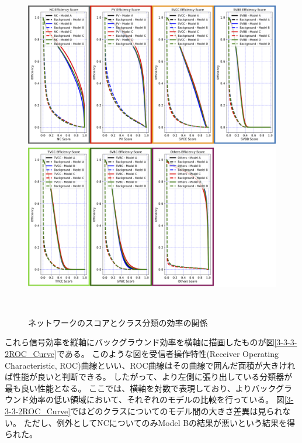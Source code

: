 \begin{figure}[htbp]
 \centering
   \begin{minipage}{1.0\textwidth}
    \centering
    \includegraphics[width=1.0\textwidth, clip]{Figure/3Networks/3-3-3-2Efficiency_Curve_1.png}
   \end{minipage}

   \begin{minipage}{1.0\textwidth}
   \centering
    \includegraphics[width=1.0\textwidth, clip]{Figure/3Networks/3-3-3-2Efficiency_Curve_2.png}
   \end{minipage}
  \caption{ネットワークのスコアとクラス分類の効率の関係}
  \label{3-3-3-2Efficiency_Curve}
\end{figure}

これら信号効率を縦軸にバックグラウンド効率を横軸に描画したものが図\ref{3-3-3-2ROC_Curve}である。
このような図を受信者操作特性(Receiver Operating Characteristic, ROC)曲線といい、ROC曲線はその曲線で囲んだ面積が大きければ性能が良いと判断できる。
したがって、より左側に張り出している分類器が最も良い性能となる。
ここでは、横軸を対数で表現しており、よりバックグラウンド効率の低い領域において、それぞれのモデルの比較を行っている。
図\ref{3-3-3-2ROC_Curve}ではどのクラスについてのモデル間の大きさ差異は見られない。
ただし、例外としてNCについてのみModel Bの結果が悪いという結果を得られた。

